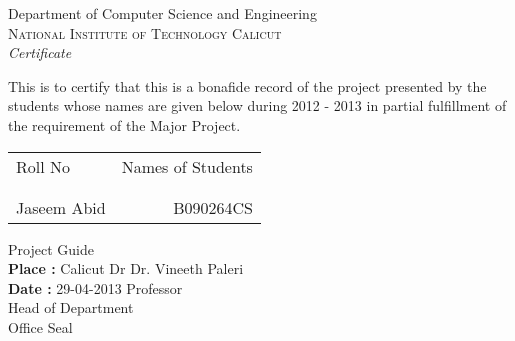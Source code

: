 \newpage
\thispagestyle{empty}

\begin{center}

\huge{Department of Computer Science and Engineering}\\[0.5cm]
\normalsize
\textsc{National Institute of Technology Calicut}\\[2.0cm]

\emph{\LARGE Certificate}\\[2.5cm]
\end{center}
\normalsize
This is to certify that this is a bonafide record of the project presented by
the students whose names are given below during 2012 - 2013 in partial
fulfillment of the requirement
of the Major Project.\\[1.0cm]

\begin{table}[h]
\centering
\begin{tabular}{lr}
Roll No & Names of Students \\ \\ \hline
\\
Jaseem Abid & B090264CS
\end{tabular}
\end{table}

\vspace*{1.0cm}
\noindent

\hfill Project Guide\\
\textbf{Place :} Calicut \hfill Dr Dr. Vineeth Paleri\\
\textbf{Date :} 29-04-2013 \hfill Professor\\

\vspace*{1.0cm}
\hfill Head of Department\\

\vspace*{1.5cm}
\hfill Office Seal

\nopagebreak

